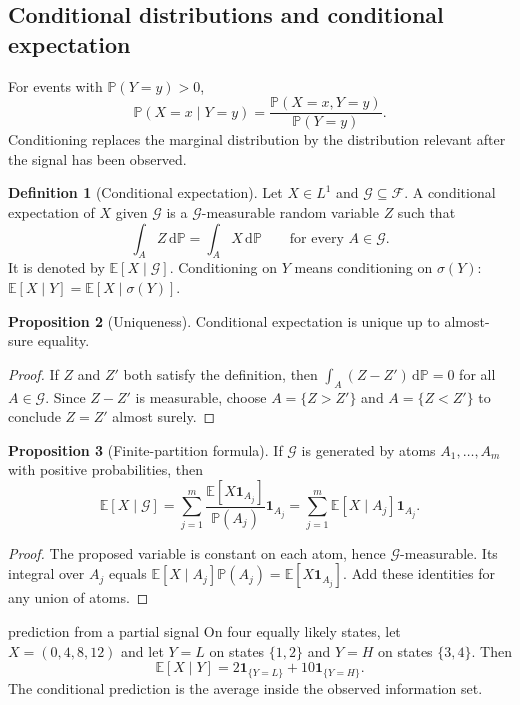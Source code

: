 \documentclass[10pt]{article}
\newcommand{\E}{\mathbb E}
\newcommand{\Pbb}{\mathbb P}
\newcommand{\1}{\mathbf 1}
\newcommand{\cF}{\mathcal F}
\newcommand{\cG}{\mathcal G}
\newcommand{\dd}{\,\mathrm d}
\theoremstyle{definition}
\newtheorem{definition}{Definition}[section]
\newtheorem{proposition}[definition]{Proposition}
\begin{document}
\subsection{Conditional distributions and conditional expectation}

For events with $\Pbb(Y=y)>0$,
\[
\Pbb(X=x\mid Y=y)
=\frac{\Pbb(X=x,Y=y)}{\Pbb(Y=y)}.
\]
Conditioning replaces the marginal distribution by the distribution relevant
after the signal has been observed.

\begin{definition}[Conditional expectation]
Let $X\in L^1$ and $\cG\subseteq\cF$. A conditional expectation of $X$ given
$\cG$ is a $\cG$-measurable random variable $Z$ such that
\[
\int_A Z\dd\Pbb=\int_A X\dd\Pbb
\qquad\text{for every }A\in\cG.
\]
It is denoted by $\E[X\mid\cG]$. Conditioning on $Y$ means conditioning on
$\sigma(Y)$:
$\E[X\mid Y]=\E[X\mid\sigma(Y)]$.
\end{definition}

\begin{proposition}[Uniqueness]
Conditional expectation is unique up to almost-sure equality.
\end{proposition}
\begin{proof}
If $Z$ and $Z'$ both satisfy the definition, then
$\int_A(Z-Z')\dd\Pbb=0$ for all $A\in\cG$. Since $Z-Z'$ is measurable, choose
$A=\{Z>Z'\}$ and $A=\{Z<Z'\}$ to conclude $Z=Z'$ almost surely.
\end{proof}

\begin{proposition}[Finite-partition formula]
If $\cG$ is generated by atoms $A_1,\ldots,A_m$ with positive probabilities,
then
\[
\E[X\mid\cG]
=\sum_{j=1}^m\frac{\E[X\1_{A_j}]}{\Pbb(A_j)}\1_{A_j}
=\sum_{j=1}^m\E[X\mid A_j]\1_{A_j}.
\]
\end{proposition}
\begin{proof}
The proposed variable is constant on each atom, hence $\cG$-measurable. Its
integral over $A_j$ equals
$\E[X\mid A_j]\Pbb(A_j)=\E[X\1_{A_j}]$. Add these identities for any union of
atoms.
\end{proof}

\begin{boardexample}{prediction from a partial signal}
On four equally likely states, let $X=(0,4,8,12)$ and let $Y=L$ on states
$\{1,2\}$ and $Y=H$ on states $\{3,4\}$. Then
\[
\E[X\mid Y]
=2\1_{\{Y=L\}}+10\1_{\{Y=H\}}.
\]
The conditional prediction is the average inside the observed information set.
\end{boardexample}
\end{document}
